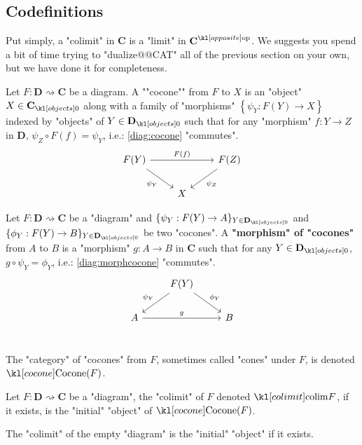 \documentclass[main.tex]{subfiles}
\begin{document}
\subsection{Codefinitions}
Put simply, a "colimit" in $\mathbf{C}$ is a "limit" in $\op{\mathbf{C}}$. We suggests you spend a bit of time trying to "dualize@@CAT" all of the previous section on your own, but we have done it for completeness.  
\begin{defn}[Cocone]
    Let $F: \mathbf{D}\rightsquigarrow \mathbf{C}$ be a diagram. \AP A ""cocone"" from $F$ to $X$ is an "object" $X \in \obj{\mathbf{C}}$ along with a family of "morphisms" $\left\{ \psi_Y: F(Y) \rightarrow X \right\}$ indexed by "objects" of $Y \in \obj{\mathbf{D}}$ such that for any "morphism" $f:Y \rightarrow Z$ in $\mathbf{D}$, $\psi_Z \circ F(f) = \psi_Y$, i.e.: \eqref{diag:cocone} "commutes".
    \begin{equation}\label{diag:cocone}
        \begin{tikzcd}
            F(Y) \arrow[rd, "\psi_Y"'] \arrow[rr, "F(f)"] & & F(Z) \arrow[ld, "\psi_Z"]\\
            & X & 
        \end{tikzcd}
    \end{equation}
\end{defn}
\begin{defn}
    Let $F:\mathbf{D}\rightsquigarrow \mathbf{C}$ be a "diagram" and $\{\psi_Y: F(Y)\rightarrow A \}_{Y \in \obj{\mathbf{D}}}$ and $\{\phi_Y: F(Y)\rightarrow B\}_{Y \in \obj{\mathbf{D}}}$ be two "cocones". A \textbf{"morphism" of "cocones"} from $A$ to $B$ is a "morphism" $g:A\rightarrow B$ in $\mathbf{C}$ such that for any $Y\in \obj{\mathbf{D}}$, $g \circ \psi_Y = \phi_Y$, i.e.: \eqref{diag:morphcocone} "commutes".
    \begin{equation}\label{diag:morphcocone}
        \begin{tikzcd}
            & F(Y) \arrow[ld, "\psi_Y"'] \arrow[rd, "\phi_Y"] & \\
            A \arrow[rr, "g"] &  & B  \\
        \end{tikzcd}
    \end{equation}
\end{defn}
The "category" of "cocones" from $F$, sometimes called "cones" under $F$, is denoted $\cocone(F)$.
\begin{defn}[Colimit]
    \AP Let $F:\mathbf{D} \rightsquigarrow \mathbf{C}$ be a "diagram", the "colimit" of $F$ denoted $\colim F$, if it exists, is the "initial" "object" of $\cocone(F)$.
\end{defn}
\begin{exmp}
    The "colimit" of the empty "diagram" is the "initial" "object" if it exists.
\end{exmp}
\end{document}
